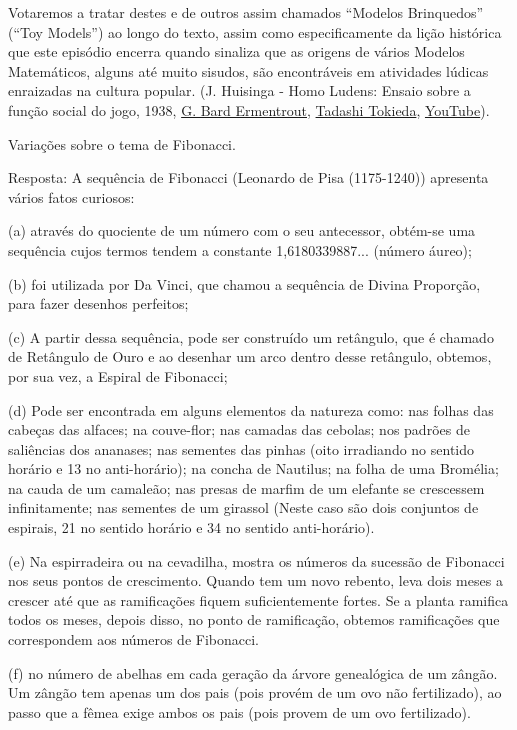     Votaremos a tratar destes e de outros assim chamados ``Modelos Brinquedos'' (``Toy Models'') ao longo do texto, assim como especificamente da lição histórica que este episódio encerra quando sinaliza que as origens de vários Modelos Matemáticos, alguns até muito sisudos, são encontráveis em atividades lúdicas enraizadas na cultura popular. (J. Huisinga - Homo Ludens: Ensaio sobre a função social do jogo, 1938,
    \href{http://www.math.pitt.edu/~bard/bardware/toys2.pdf}{G. Bard Ermentrout}, \href{https://mathematics.stanford.edu/people/tadashi-tokieda}{Tadashi Tokieda}, \href{https://www.youtube.com/playlist?listPLt5AfwLFPxWI9eDSJREzp1wvOJsjt23H}{YouTube}).

\begin{exercise}
Variações sobre o tema de Fibonacci.
\end{exercise}

{\color{red}
Resposta: A sequência de Fibonacci (Leonardo de Pisa (1175-1240)) apresenta vários fatos curiosos:

(a) através do quociente de um número com o seu antecessor, obtém-se uma sequência cujos termos tendem a constante 1,6180339887... (número áureo);

(b) foi utilizada por Da Vinci, que chamou a sequência de Divina Proporção, para fazer desenhos perfeitos;

(c) A partir dessa sequência, pode ser construído um retângulo, que é chamado de Retângulo de Ouro e ao desenhar um arco dentro desse retângulo, obtemos, por sua vez, a Espiral de Fibonacci;

(d) Pode ser encontrada em alguns elementos da natureza como:
nas folhas das cabeças das alfaces;
na couve-flor;
nas camadas das cebolas;
nos padrões de saliências dos ananases;
nas sementes das pinhas (oito irradiando no sentido horário e 13 no anti-horário);
na concha de Nautilus;
na folha de uma Bromélia;
na cauda de um camaleão;
nas presas de marfim de um elefante se crescessem infinitamente;
nas sementes de um girassol (Neste caso são dois conjuntos de espirais, 21 no sentido horário e 34 no sentido anti-horário).

(e) Na espirradeira ou na cevadilha, mostra os números da sucessão de Fibonacci nos seus pontos de crescimento. Quando tem um novo rebento, leva dois meses a crescer até que as ramificações fiquem suficientemente fortes. Se a planta ramifica todos os meses, depois disso, no ponto de ramificação, obtemos ramificações que correspondem aos números de Fibonacci.

(f) no número de abelhas em cada geração da árvore genealógica de um zângão. Um zângão tem apenas um dos pais (pois provém de um ovo não fertilizado), ao passo que a fêmea exige ambos os pais (pois provem de um ovo fertilizado).
}


